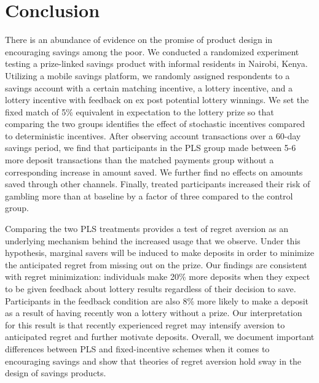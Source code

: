 \documentclass[12pt, titlepage]{article}
\begin{document}
		

		

\section{Conclusion} \label{sec:conclusion}

	There is an abundance of evidence on the promise of product design in encouraging savings among the poor. We conducted a randomized experiment testing a prize-linked savings product with informal residents in Nairobi, Kenya. Utilizing a mobile savings platform, we randomly assigned respondents to a savings account with a certain matching incentive, a lottery incentive, and a lottery incentive with feedback on ex post potential lottery winnings. We set the fixed match of 5\% equivalent in expectation to the lottery prize so that comparing the two groups identifies the effect of stochastic incentives compared to deterministic incentives. After observing account transactions over a 60-day savings period, we find that participants in the PLS group made between 5-6 more deposit transactions than the matched payments group without a corresponding increase in amount saved. We further find no effects on amounts saved through other channels. Finally, treated participants increased their risk of gambling more than at baseline by a factor of three compared to the control group.

	Comparing the two PLS treatments provides a test of regret aversion as an underlying mechanism behind the increased usage that we observe. Under this hypothesis, marginal savers will be induced to make deposits in order to minimize the anticipated regret from missing out on the prize. Our findings are consistent with regret minimization: individuals make 20\% more deposits when they expect to be given feedback about lottery results regardless of their decision to save. Participants in the feedback condition are also 8\% more likely to make a deposit as a result of having recently won a lottery without a prize. Our interpretation for this result is that recently experienced regret may intensify aversion to anticipated regret and further motivate deposits. Overall, we document important differences between PLS and fixed-incentive schemes when it comes to encouraging savings and show that theories of regret aversion hold sway in the design of savings products.
\end{document}
